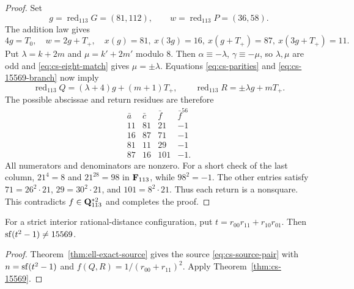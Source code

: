 \begin{proof}
Set
\[
 g=\operatorname{red}_{113}G=(81,112),\qquad
 w=\operatorname{red}_{113}P=(36,58).
\]
The addition law gives
\[
 4g=T_0,\quad w=2g+T_+,\quad
 x(g)=81,\ x(3g)=16,\ x(g+T_+)=87,\ x(3g+T_+)=11.
\]
Put $\lambda=k+2m$ and $\mu=k'+2m'$ modulo $8$.  Then
$\alpha\equiv-\lambda$, $\gamma\equiv-\mu$, so $\lambda,\mu$ are odd and
\eqref{eq:cs-eight-match} gives $\mu=\pm\lambda$.  Equations
\eqref{eq:cs-parities} and \eqref{eq:cs-15569-branch} now imply
\[
 \operatorname{red}_{113}Q=(\lambda+4)g+(m+1)T_+,
 \qquad
 \operatorname{red}_{113}R=\pm\lambda g+mT_+.
\]
The possible abscissae and return residues are therefore
\begin{equation}\label{eq:cs-four-residues}
\begin{array}{cc|c|c}
\bar a&\bar c&\bar f&\bar f^{56}\\ \hline
11&81&21&-1\\
16&87&71&-1\\
81&11&29&-1\\
87&16&101&-1.
\end{array}
\end{equation}
All numerators and denominators are nonzero.  For a short check of the
last column, $21^4=8$ and $21^{28}=98$ in $\F_{113}$, while $98^2=-1$.
The other entries satisfy $71=26^2\cdot21$, $29=30^2\cdot21$, and
$101=8^2\cdot21$.  Thus each return is a nonsquare.  This contradicts
$f\in\Q_{113}^{*2}$ and completes the proof.
\end{proof}

\begin{corollary}\label{cor:cs-15569-layer}
For a strict interior rational-distance configuration, put
$t=r_{00}r_{11}+r_{10}r_{01}$.  Then $\sf(t^2-1)\ne15569$.
\end{corollary}
\begin{proof}
Theorem~\ref{thm:ell-exact-source} gives the source
\eqref{eq:cs-source-pair} with $n=\sf(t^2-1)$ and
$f(Q,R)=1/(r_{00}+r_{11})^2$.  Apply
Theorem~\ref{thm:cs-15569}.
\end{proof}
